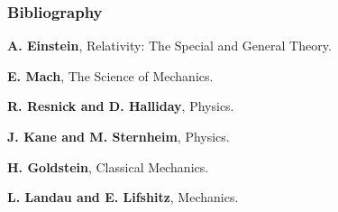 \documentclass[10pt]{article}
\begin{document}
\vspace{+0.90em}

{\centering\subsubsection*{Bibliography}}

\vspace{+0.30em}

\par \textbf{A. Einstein}, Relativity: The Special and General Theory.
\bigskip
\par \textbf{E. Mach}, The Science of Mechanics.
\bigskip
\par \textbf{R. Resnick and D. Halliday}, Physics.
\bigskip
\par \textbf{J. Kane and M. Sternheim}, Physics.
\bigskip
\par \textbf{H. Goldstein}, Classical Mechanics.
\bigskip
\par \textbf{L. Landau and E. Lifshitz}, Mechanics.
\end{document}
